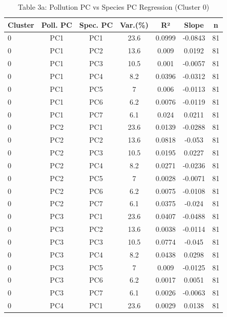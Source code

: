 

\begin{table}[htbp]
    \centering
    \small
    \caption{Table 3a: Pollution PC vs Species PC Regression (Cluster 0)}
    \label{tab:table3a_pollution_pc_species_pc_regression}
    \begin{tabular}{lcccccc}
        \toprule
        Cluster & Poll. PC & Spec. PC & Var.(\%) & R² & Slope & n \\
        \midrule
        0 & PC1 & PC1 & 23.6 & 0.0999 & -0.0843 & 81 \\
        0 & PC1 & PC2 & 13.6 & 0.009 & 0.0192 & 81 \\
        0 & PC1 & PC3 & 10.5 & 0.001 & -0.0057 & 81 \\
        0 & PC1 & PC4 & 8.2 & 0.0396 & -0.0312 & 81 \\
        0 & PC1 & PC5 & 7 & 0.006 & -0.0113 & 81 \\
        0 & PC1 & PC6 & 6.2 & 0.0076 & -0.0119 & 81 \\
        0 & PC1 & PC7 & 6.1 & 0.024 & 0.0211 & 81 \\
        0 & PC2 & PC1 & 23.6 & 0.0139 & -0.0288 & 81 \\
        0 & PC2 & PC2 & 13.6 & 0.0818 & -0.053 & 81 \\
        0 & PC2 & PC3 & 10.5 & 0.0195 & 0.0227 & 81 \\
        0 & PC2 & PC4 & 8.2 & 0.0271 & -0.0236 & 81 \\
        0 & PC2 & PC5 & 7 & 0.0028 & -0.0071 & 81 \\
        0 & PC2 & PC6 & 6.2 & 0.0075 & -0.0108 & 81 \\
        0 & PC2 & PC7 & 6.1 & 0.0375 & -0.024 & 81 \\
        0 & PC3 & PC1 & 23.6 & 0.0407 & -0.0488 & 81 \\
        0 & PC3 & PC2 & 13.6 & 0.0038 & -0.0114 & 81 \\
        0 & PC3 & PC3 & 10.5 & 0.0774 & -0.045 & 81 \\
        0 & PC3 & PC4 & 8.2 & 0.0438 & 0.0298 & 81 \\
        0 & PC3 & PC5 & 7 & 0.009 & -0.0125 & 81 \\
        0 & PC3 & PC6 & 6.2 & 0.0017 & 0.0051 & 81 \\
        0 & PC3 & PC7 & 6.1 & 0.0026 & -0.0063 & 81 \\
        0 & PC4 & PC1 & 23.6 & 0.0029 & 0.0138 & 81 \\

\end{tabular}
\end{table}

